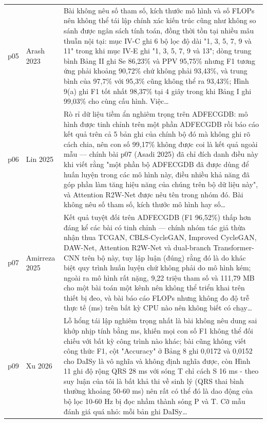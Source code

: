 \begin{longtable}{@{}L{1.05cm} L{3.2cm} L{10.1cm}@{}}
p05 & {\scriptsize Arash 2023} & {\scriptsize Bài không nêu số tham số, kích thước mô hình và số FLOPs nên không thể tái lập chính xác kiến trúc cũng như không so sánh được ngân sách tính toán, đồng thời tồn tại nhiều mâu thuẫn nội tại: mục IV-C ghi 6 bộ lọc độ dài "1, 3, 5, 7, 9 và 11" trong khi mục IV-E ghi "1, 3, 5, 7, 9 và 13"; dòng trung bình Bảng II ghi Se 86,23\% và PPV 95,75\% nhưng F1 tương ứng phải khoảng 90,72\% chứ không phải 93,43\%, và trung bình của 97,7\% với 95,3\% cũng không thể ra 93,43\%; Hình 9(a) ghi F1 tốt nhất 98,37\% tại 4 giây trong khi Bảng I ghi 99,03\% cho cùng cấu hình. Việc…} \\[2pt]
p06 & {\scriptsize Lin 2025} & {\scriptsize Rò rỉ dữ liệu tiềm ẩn nghiêm trọng trên ADFECGDB: mô hình được tinh chỉnh trên một phần ADFECGDB rồi báo cáo kết quả trên cả 5 bản ghi của chính bộ đó mà không ghi rõ cách chia, nên con số 99,17\% không được coi là kết quả ngoài mẫu — chính bài p07 (Asadi 2025) đã chỉ đích danh điều này khi viết rằng "một phần bộ ADFECGDB đã được dùng để huấn luyện trong các mô hình này, điều nhiều khả năng đã góp phần làm tăng hiệu năng của chúng trên bộ dữ liệu này", và Attention R2W-Net được nêu tên trong nhóm đó. Bài không nêu số tham số, kích thước mô hình hay số…} \\[2pt]
p07 & {\scriptsize Amirreza 2025} & {\scriptsize Kết quả tuyệt đối trên ADFECGDB (F1 96,52\%) thấp hơn đáng kể các bài có tinh chỉnh — chính nhóm tác giả thừa nhận thua TCGAN, CBLS-CycleGAN, Improved CycleGAN, DAW-Net, Attention R2W-Net và dual-branch Transformer-CNN trên bộ này, tuy lập luận (đúng) rằng đó là do khác biệt quy trình huấn luyện chứ không phải do mô hình kém; ngoài ra mô hình rất nặng, 9,22 triệu tham số và 111,79 MB cho một bài toán một kênh nên không thể triển khai trên thiết bị đeo, và bài báo cáo FLOPs nhưng không đo độ trễ thực tế (ms) trên bất kỳ CPU nào nên không biết có chạy…} \\[2pt]
p09 & {\scriptsize Xu 2026} & {\scriptsize Lỗ hổng tái lập nghiêm trọng nhất là bài không nêu dung sai khớp nhịp tính bằng ms, khiến mọi con số F1 không thể đối chiếu với bất kỳ công trình nào khác; bài cũng không viết công thức F1, cột "Accuracy" ở Bảng 8 ghi 0,0172 và 0,0152 cho DaISy là vô nghĩa và không định nghĩa được, còn Hình 11 ghi độ rộng QRS 28 ms với sóng T chỉ cách S 16 ms - theo suy luận của tôi là bất khả thi về sinh lý (QRS thai bình thường khoảng 50-60 ms) nên rất có thể đó là dao động của bộ lọc 10-60 Hz bị đọc nhầm thành sóng P và T. Cỡ mẫu đánh giá quá nhỏ: mỗi bản ghi DaISy…} \\[2pt]

\end{longtable}
